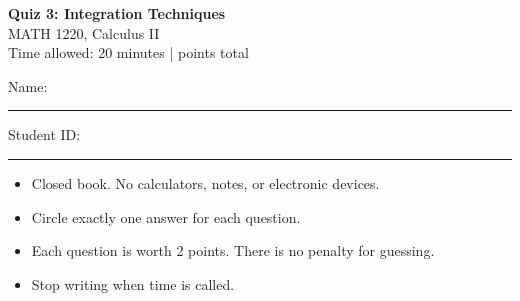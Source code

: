 \documentclass[11pt]{article}
\begin{document}
\begin{center}
  {\LARGE\bfseries Quiz 3: Integration Techniques}\\[4pt]
  {\large MATH 1220, Calculus II}\\[2pt]
  Time allowed: 20 minutes \quad |  points total
\end{center}

\vspace{0.5em}
Name: \rule{2.8in}{0.4pt} \hfill Student ID: \rule{1.5in}{0.4pt}

\vspace{1em}
\begin{tcolorbox}[colback=accent!6,colframe=accent,boxrule=0.8pt,arc=2mm,
  title=\textbf{Instructions}]
  \begin{itemize}[leftmargin=1.2em, itemsep=1pt, topsep=1pt]
    \item Closed book. No calculators, notes, or electronic devices.
    \item Circle exactly one answer for each question.
    \item Each question is worth 2 points. There is no penalty for guessing.
    \item Stop writing when time is called.
  \end{itemize}
\end{tcolorbox}
\end{document}
